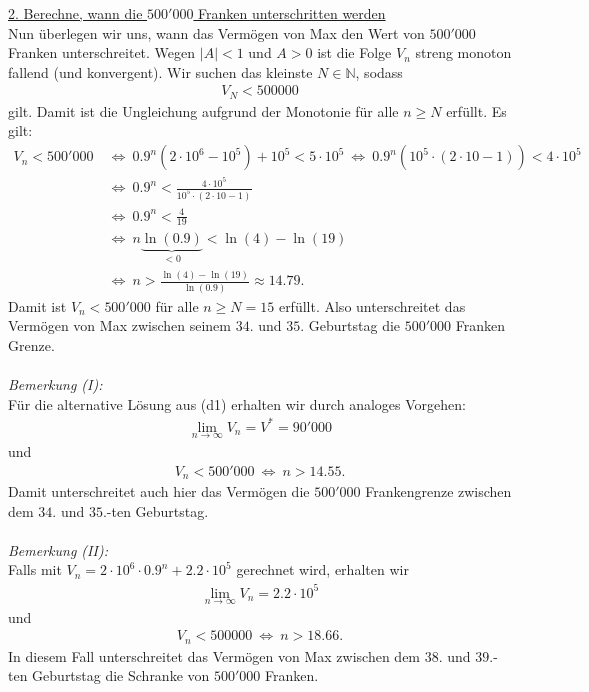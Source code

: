 \newpage
\underline{2. Berechne, wann die $ 500'000 $ Franken unterschritten werden}\\
Nun überlegen wir uns, wann das Vermögen von Max den Wert von $ 500'000 $ Franken unterschreitet. Wegen $ | A | < 1$ und $ A > 0 $ ist die Folge $ V_n $ streng monoton fallend (und konvergent).
Wir suchen das kleinste $ N \in \mathbb{N} $, sodass 
\begin{align*}
V_N < 500000
\end{align*}
gilt. Damit ist die Ungleichung aufgrund der Monotonie für alle $ n \geq N $ erfüllt.
Es gilt:
\begin{align*}
V_n < 500'000
&\ \Leftrightarrow \
0.9^n(2 \cdot 10^6 - 10^5) + 10^5 < 5 \cdot 10^5
\ \Leftrightarrow \
0.9^n(10^5 \cdot (2 \cdot 10 - 1)) < 4 \cdot 10^5\\
&\ \Leftrightarrow \
0.9^n < \frac{4 \cdot 10^5 }{10^5 \cdot (2 \cdot 10 - 1)}\\
&\ \Leftrightarrow \
0.9^n < \frac{4}{19}\\
&\ \Leftrightarrow \
n \underbrace{\ln(0.9)}_{<0} < \ln(4) - \ln(19)\\
&\ \Leftrightarrow \
n > \frac{\ln(4) - \ln(19)}{\ln(0.9)} \approx 14.79.
\end{align*}
Damit ist $ V_n  < 500'000 $ für alle $ n \geq N = 15 $ erfüllt.
Also unterschreitet das Vermögen von Max zwischen seinem $ 34. $ und $ 35. $ Geburtstag die $ 500'000 $ Franken Grenze.\\
\\
\textit{Bemerkung  (I):}\\
Für die alternative Lösung aus (d1) erhalten wir durch analoges Vorgehen:
\begin{align*}
\lim\limits_{n \to \infty } V_n = V^\ast = 90'000
\end{align*}
und 
\begin{align*}
V_n < 500'000 \ \Leftrightarrow \ 
n > 14.55.
\end{align*}
Damit unterschreitet auch hier das Vermögen die $ 500'000 $ Frankengrenze zwischen dem $ 34. $ und $ 35. $-ten Geburtstag.\\
\\
\textit{Bemerkung (II):}\\
Falls mit $ V_n = 2 \cdot 10^6 \cdot 0.9^n+2.2 \cdot 10^5  $ gerechnet wird, erhalten wir 
\begin{align*}
\lim \limits_{n \to \infty} V_n = 2.2 \cdot 10^5
\end{align*}
und
\begin{align*}
V_n < 500000 \ \Leftrightarrow \ n > 18.66.
\end{align*}
In diesem Fall unterschreitet das Vermögen von Max zwischen dem $ 38. $ und $ 39. $-ten Geburtstag die Schranke von $ 500'000 $ Franken.
\newpage